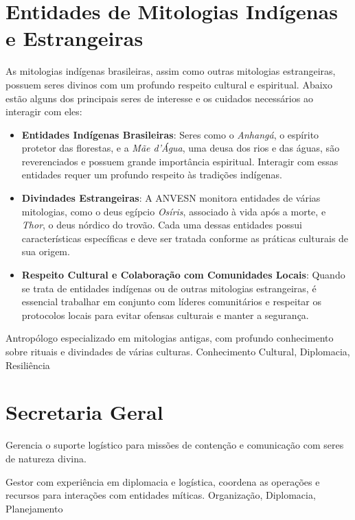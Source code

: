 \section{Entidades de Mitologias Indígenas e Estrangeiras}
As mitologias indígenas brasileiras, assim como outras mitologias estrangeiras, possuem seres divinos com um profundo respeito cultural e espiritual. Abaixo estão alguns dos principais seres de interesse e os cuidados necessários ao interagir com eles:

\begin{itemize}
    \item \textbf{Entidades Indígenas Brasileiras}: Seres como o \textit{Anhangá}, o espírito protetor das florestas, e a \textit{Mãe d'Água}, uma deusa dos rios e das águas, são reverenciados e possuem grande importância espiritual. Interagir com essas entidades requer um profundo respeito às tradições indígenas.
    \item \textbf{Divindades Estrangeiras}: A ANVESN monitora entidades de várias mitologias, como o deus egípcio \textit{Osíris}, associado à vida após a morte, e \textit{Thor}, o deus nórdico do trovão. Cada uma dessas entidades possui características específicas e deve ser tratada conforme as práticas culturais de sua origem.
    \item \textbf{Respeito Cultural e Colaboração com Comunidades Locais}: Quando se trata de entidades indígenas ou de outras mitologias estrangeiras, é essencial trabalhar em conjunto com líderes comunitários e respeitar os protocolos locais para evitar ofensas culturais e manter a segurança.
\end{itemize}



{Antropólogo especializado em mitologias antigas, com profundo conhecimento sobre rituais e divindades de várias culturas.}
{Conhecimento Cultural, Diplomacia, Resiliência}

\section{Secretaria Geral}
Gerencia o suporte logístico para missões de contenção e comunicação com seres de natureza divina.

{Gestor com experiência em diplomacia e logística, coordena as operações e recursos para interações com entidades míticas.}
{Organização, Diplomacia, Planejamento}

